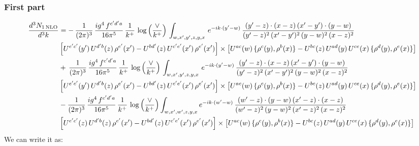\documentclass[9pt]{article}
\numberwithin{equation}{section}
\begin{document}
 \subsubsection{First part}
\begin{align}
     \frac{d^{3}N_{1\,\rm NLO}}{d^{3}k} & =   -\,\frac{1}{(2\pi)^{3}}\, \frac{ig^{4}\,f^{c'd'a}}{16\pi^{5}}\, \frac{1}{k^{+}}\,\log{\left(\frac{\vee}{k^{+}}\right)}\, \int_{w,x',y',z,y,x}\, e^{-ik\cdot (y'-w)}\,\frac{(y'-z)\cdot (x-z)\,(x'-y')\cdot (y-w)}{(y'-z)^{2}\,(x'-y')^{2}\,(y-w)^{2}\,(x-z)^{2}}\notag \\ &  \left[U^{e'c'}(y')\,U^{d'b}(z)\,\rho^{e'}(x')-U^{bd'}(z)\,U^{c'e'}(x')\,\rho^{e'}(x')\right]\times  \left[U^{ac}(w)\, \{\rho^{c}(y),\rho^{b}(x)\}-U^{bc}(z)\,U^{ad}(y)\,U^{ce}(x)\,\{\rho^{d}(y),\rho^{e}(x)\}\right] \notag \\
&   +\,\frac{1}{(2\pi)^{3}}\, \frac{ig^{4}\,f^{c'd'a}}{16\pi^{5}}\, \frac{1}{k^{+}}\,\log{\left(\frac{\vee}{k^{+}}\right)}\, \int_{w,x',y',z,y,x}\, e^{-ik\cdot (y'-w)}\,\frac{(y'-z)\cdot (x-z)\,(x'-y')\cdot (y-w)}{(y'-z)^{2}\,(x'-y')^{2}\,(y-w)^{2}\,(x-z)^{2}}\notag \\ &    \left[U^{e'c'}(y')\,U^{d'b}(z)\,\rho^{e'}(x')-U^{bd'}(z)\,U^{c'e'}(x')\,\rho^{e'}(x')\right]\times  \left[U^{ac}(w)\, \{\rho^{c}(y),\rho^{b}(x)\}-U^{bc}(z)\,U^{ad}(y)\,U^{ce}(x)\,\{\rho^{d}(y),\rho^{e}(x)\}\right] \notag \\
&   -\frac{1}{(2\pi)^{3}}\, \frac{ig^{4}\,f^{c'd'a}}{16\pi^{5}}\, \frac{1}{k^{+}}\,\log{\left(\frac{\vee}{k^{+}}\right)}\int_{w,x',w',z,y,x} e^{-ik\cdot (w'-w)}\,\frac{(w'-z)\cdot (y-w)\,(x'-z)\cdot (x-z)}{(w'-z)^{2}\,(y-w)^{2}\,(x'-z)^{2}\,(x-z)^{2}}\notag \\
&   \left[U^{e'c'}(z)\,U^{d'b}(z)\,\rho^{e'}(x')-U^{bd'}(z)\,U^{c'e'}(x')\,\rho^{e'}(x')\right]  \times\left[U^{ac}(w)\, \{\rho^{c}(y),\rho^{b}(x)\}-U^{bc}(z)\,U^{ad}(y)\,U^{ce}(x)\,\{\rho^{d}(y),\rho^{e}(x)\}\right]
\end{align}
We can write it as: 
\end{document}
